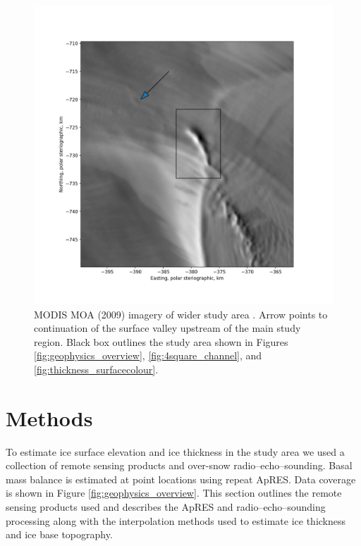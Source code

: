 \begin{figure}[!ht]
\centering
\includegraphics[width=1.0\textwidth]{chapters/2/moa_solo.png}
\caption[Image of valley]{MODIS MOA (2009) imagery of wider study area \citep{haran2014modis}. Arrow points to continuation of the surface valley upstream of the main study region. Black box outlines the study area shown in Figures \ref{fig:geophysics_overview}, \ref{fig:4square_channel}, and \ref{fig:thickness_surfacecolour}. }
\label{fig:moa_solo}
\end{figure}


\newpage

\section{Methods} \label{sec:method}

To estimate ice surface elevation and ice thickness in the study area we used a collection of remote sensing products and over-snow radio--echo--sounding. Basal mass balance is estimated at point locations using repeat ApRES. Data coverage is shown in Figure \ref{fig:geophysics_overview}. This section outlines the remote sensing products used and describes the ApRES and radio--echo--sounding processing along with the interpolation methods used to estimate ice thickness and ice base topography. 

